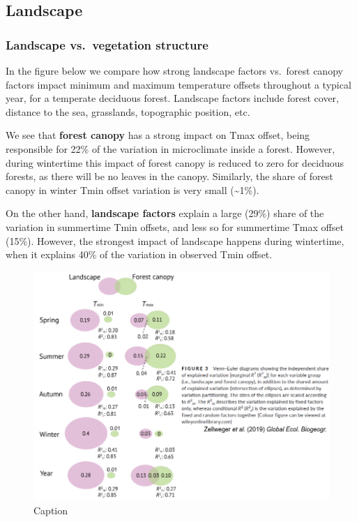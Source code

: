 \documentclass[12pt,oneside]{book}
\begin{document}
\subsection{Landscape}\label{landscape}

\subsubsection{Landscape vs.~vegetation
structure}\label{landscape-vs.vegetation-structure}

In the figure below we compare how strong landscape factors vs.~forest
canopy factors impact minimum and maximum temperature offsets throughout
a typical year, for a temperate deciduous forest. Landscape factors
include forest cover, distance to the sea, grasslands, topographic
position, etc.

We see that \textbf{forest canopy} has a strong impact on Tmax offset,
being responsible for 22\% of the variation in microclimate inside a
forest. However, during wintertime this impact of forest canopy is
reduced to zero for deciduous forests, as there will be no leaves in the
canopy. Similarly, the share of forest canopy in winter Tmin offset
variation is very small (\textasciitilde{}1\%).

On the other hand, \textbf{landscape factors} explain a large (29\%)
share of the variation in summertime Tmin offsets, and less so for
summertime Tmax offset (15\%). However, the strongest impact of
landscape happens during wintertime, when it explains 40\% of the
variation in observed Tmin offset.

\begin{figure}

{\centering \includegraphics[width=1\linewidth]{figures/Figure1027} 

}

\caption{Caption}\label{fig:Micro27}
\end{figure}
\end{document}
